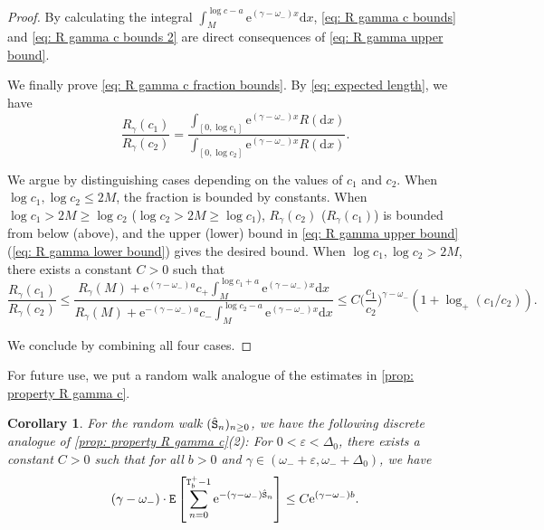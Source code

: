\documentclass[12pt]{article}
\numberwithin{equation}{section}
\theoremstyle{plain}
\newtheorem{Cor}[thm]{Corollary}
\theoremstyle{definition}
\newcommand{\D}{\mathrm{d}}
\begin{document}
\begin{proof}
\noindent By calculating the integral $ \int^{\log c-a}_{M} \mathrm{e}^{(\gamma-\omega_-)x}\D x$, \eqref{eq: R gamma c bounds} and \eqref{eq: R gamma c bounds 2} are direct consequences of \eqref{eq: R gamma upper bound}.

We finally prove \eqref{eq: R gamma c fraction bounds}. By \eqref{eq: expected length}, we have
\[\frac{R_{\gamma}(c_1)}{R_{\gamma}(c_2)} = \frac{\int_{[0, \log c_1]} \mathrm{e}^{(\gamma-\omega_-)x}R(\mathrm{d}x)}{\int_{[0, \log c_2]} \mathrm{e}^{(\gamma-\omega_-)x}R(\mathrm{d}x)}. \]

\noindent We argue by distinguishing cases depending on the values of $c_1$ and $c_2$. When $\log c_1, \log c_2\leq 2M$, the fraction is bounded by constants. When $\log c_1 > 2M\geq \log c_2$ ($\log c_2 > 2M\geq \log c_1$), $R_{\gamma}(c_2)$ ($R_{\gamma}(c_1)$) is bounded from below (above), and the upper (lower) bound in \eqref{eq: R gamma upper bound} (\eqref{eq: R gamma lower bound}) gives the desired bound. When $\log c_1, \log c_2>2M$, there exists a constant $C>0$ such that
\[
\frac{R_{\gamma}(c_1)}{R_{\gamma}(c_2)}\leq \frac{R_{\gamma}(M)+\mathrm{e}^{(\gamma-\omega_-)a}c_+\int^{\log c_1+a}_{M} \mathrm{e}^{(\gamma-\omega_-)x}\D x}{R_{\gamma}(M)+\mathrm{e}^{-(\gamma-\omega_-)a}c_-\int^{\log c_2-a}_{M} \mathrm{e}^{(\gamma-\omega_-)x}\D x}
\le C\Big(\frac{c_1}{c_2}\Big)^{\gamma-\omega_-} \left(1+\log_+(c_1/c_2)\right).
\]

\noindent We conclude by combining all four cases.
\end{proof}

For future use, we put a random walk analogue of the estimates in \cref{prop: property R gamma c}.

\begin{Cor}
For the random walk $({\hat{\tt S}}_n)_{n\geq 0}$, we have the following discrete analogue of \cref{prop: property R gamma c}(2): For $0<\varepsilon<\Delta_0$, there exists a constant $C>0$ such that for all $b>0$ and $\gamma \in (\omega_-+\varepsilon, \omega_-+\Delta_0)$, we have
\begin{equation}\label{eq: green function r.w.}
(\gamma-\omega_-)\cdot{\tt E}\left[\sum^{{\tt T}^+_b-1}_{n=0} \mathrm{e}^{-(\gamma-\omega_-){\hat{\tt S}}_n}\right]\leq C\mathrm{e}^{(\gamma-\omega_-)b}.
\end{equation}
\end{Cor}
\end{document}
